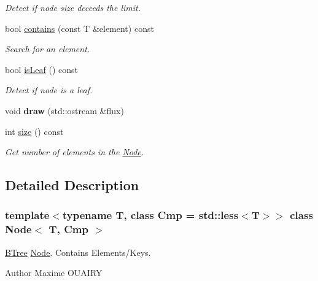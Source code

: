 \begin{DoxyCompactItemize}
\begin{DoxyCompactList}\small\item\em Detect if node size deceeds the limit. \item\end{DoxyCompactList}\item 
bool \hyperlink{classNode_abcea6531f0a58ee2efeef2aa19dcd406}{contains} (const T \&element) const 
\begin{DoxyCompactList}\small\item\em Search for an element. \item\end{DoxyCompactList}\item 
bool \hyperlink{classNode_a0b4b829c1d9dd6818e9ec4e6d0b4d8c9}{isLeaf} () const 
\begin{DoxyCompactList}\small\item\em Detect if node is a leaf. \item\end{DoxyCompactList}\item 
\hypertarget{classNode_a78d6feccbe20a22af148b69c60bdec9e}{
void {\bfseries draw} (std::ostream \&flux)}
\label{classNode_a78d6feccbe20a22af148b69c60bdec9e}

\item 
int \hyperlink{classNode_ac87f195ec96daa6d1a52767467c4c9fb}{size} () const 
\begin{DoxyCompactList}\small\item\em Get number of elements in the \hyperlink{classNode}{Node}. \item\end{DoxyCompactList}\end{DoxyCompactItemize}


\subsection{Detailed Description}
\subsubsection*{template$<$typename T, class Cmp = std::less$<$T$>$$>$ class Node$<$ T, Cmp $>$}

\hyperlink{classBTree}{BTree} \hyperlink{classNode}{Node}. Contains Elements/Keys. \begin{DoxyAuthor}{Author}
Maxime OUAIRY 
\end{DoxyAuthor}


